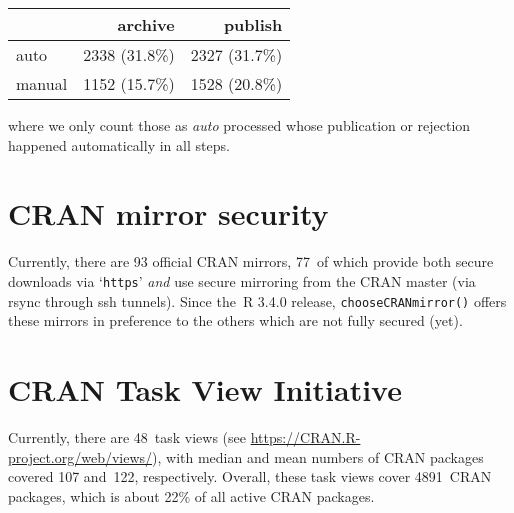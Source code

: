 \begin{longtable}[]{@{}lrr@{}}
\toprule\noalign{}
& archive & publish \\
\midrule\noalign{}
\endhead
\bottomrule\noalign{}
\endlastfoot
auto & 2338 (31.8\%) & 2327 (31.7\%) \\
manual & 1152 (15.7\%) & 1528 (20.8\%) \\
\end{longtable}

\noindent where we only count those as \emph{auto} processed whose publication or
rejection happened automatically in all steps.

\section{CRAN mirror security}\label{cran-mirror-security}

Currently, there are 93 official CRAN mirrors,
77~of which provide both
secure downloads via `\texttt{https}' \emph{and} use secure mirroring from the CRAN master
(via rsync through ssh tunnels). Since the~R 3.4.0 release, \texttt{chooseCRANmirror()}
offers these mirrors in preference to the others which are not fully secured (yet).

\section{CRAN Task View Initiative}\label{cran-task-view-initiative}

Currently, there are 48~task views (see \url{https://CRAN.R-project.org/web/views/}),
with median and mean numbers of CRAN packages covered
107 and~122, respectively.
Overall, these task views cover 4891~CRAN packages,
which is about 22\% of all active CRAN packages.


\address{%
Kurt Hornik\\
WU Wirtschaftsuniversität Wien\\%
Austria\\
%
%
\textit{ORCiD: \href{https://orcid.org/0000-0003-4198-9911}{0000-0003-4198-9911}}\\%
\href{mailto:Kurt.Hornik@R-project.org}{\nolinkurl{Kurt.Hornik@R-project.org}}%
}

\address{%
Uwe Ligges\\
TU Dortmund\\%
Germany\\
%
%
\textit{ORCiD: \href{https://orcid.org/0000-0001-5875-6167}{0000-0001-5875-6167}}\\%
\href{mailto:Uwe.Ligges@R-project.org}{\nolinkurl{Uwe.Ligges@R-project.org}}%
}

\address{%
Achim Zeileis\\
Universität Innsbruck\\%
Austria\\
%
%
\textit{ORCiD: \href{https://orcid.org/0000-0003-0918-3766}{0000-0003-0918-3766}}\\%
\href{mailto:Achim.Zeileis@R-project.org}{\nolinkurl{Achim.Zeileis@R-project.org}}%
}
